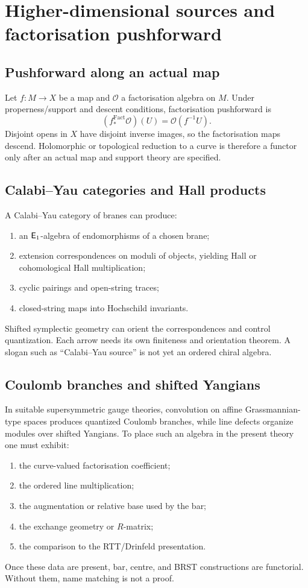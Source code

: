 \chapter{Higher-dimensional sources and factorisation pushforward}\label{chap:higher-sources}

\section{Pushforward along an actual map}
Let \(f:M\to X\) be a map and \(\mathcal O\) a factorisation algebra on \(M\).  Under properness/support and descent conditions, factorisation pushforward is
\[
 (f_*^{\mathrm{Fact}}\mathcal O)(U)=\mathcal O(f^{-1}U).
\]
Disjoint opens in \(X\) have disjoint inverse images, so the factorisation maps descend.  Holomorphic or topological reduction to a curve is therefore a functor only after an actual map and support theory are specified.

\section{Calabi--Yau categories and Hall products}
A Calabi--Yau category of branes can produce:
\begin{enumerate}
\item an \(\mathsf E_1\)-algebra of endomorphisms of a chosen brane;
\item extension correspondences on moduli of objects, yielding Hall or cohomological Hall multiplication;
\item cyclic pairings and open-string traces;
\item closed-string maps into Hochschild invariants.
\end{enumerate}
Shifted symplectic geometry can orient the correspondences and control quantization.  Each arrow needs its own finiteness and orientation theorem.  A slogan such as ``Calabi--Yau source'' is not yet an ordered chiral algebra.

\section{Coulomb branches and shifted Yangians}
In suitable supersymmetric gauge theories, convolution on affine Grassmannian-type spaces produces quantized Coulomb branches, while line defects organize modules over shifted Yangians.  To place such an algebra in the present theory one must exhibit:
\begin{enumerate}
\item the curve-valued factorisation coefficient;
\item the ordered line multiplication;
\item the augmentation or relative base used by the bar;
\item the exchange geometry or \(R\)-matrix;
\item the comparison to the RTT/Drinfeld presentation.
\end{enumerate}
Once these data are present, bar, centre, and BRST constructions are functorial.  Without them, name matching is not a proof.

